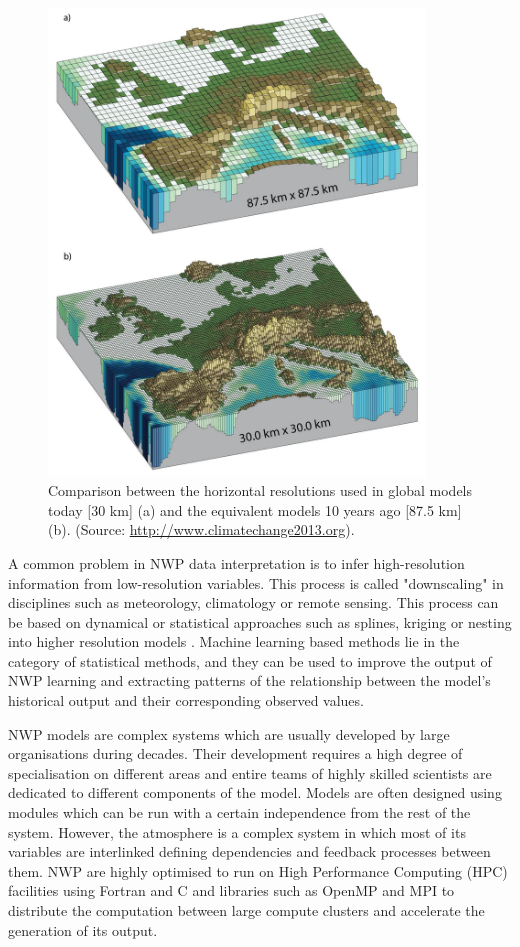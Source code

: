 \medskip

\begin{figure}[h]
 \centerline{\includegraphics[width=10cm]{nwp_resolution.jpg}} \caption{Comparison between the horizontal resolutions used in global models today [30 km] (a) and the equivalent models 10 years ago [87.5 km] (b). (Source: \url{http://www.climatechange2013.org}).}\label{model_resolution}
\end{figure}

A common problem in NWP data interpretation is to infer high-resolution information from low-resolution variables. This process is called "downscaling" in disciplines such as meteorology, climatology or remote sensing. This process can be based on dynamical or statistical approaches such as splines, kriging or nesting into higher resolution models \citep{peng2017review}. Machine learning based methods lie in the category of statistical methods, and they can be used to improve the output of NWP learning and extracting patterns of the relationship between the model's historical output and their corresponding observed values.

\medskip

NWP models are complex systems which are usually developed by large organisations during decades. Their development requires a high degree of specialisation on different areas and entire teams of highly skilled scientists are dedicated to different components of the model. Models are often designed using modules which can be run with a certain independence from the rest of the system. However, the atmosphere is a complex system in which most of its variables are interlinked defining dependencies and feedback processes between them. NWP are highly optimised to run on High Performance Computing (HPC) facilities using Fortran and C and libraries such as OpenMP \citep{dagum1998openmp} and MPI \citep{gropp1999using} to distribute the computation between large compute clusters and accelerate the generation of its output. 

